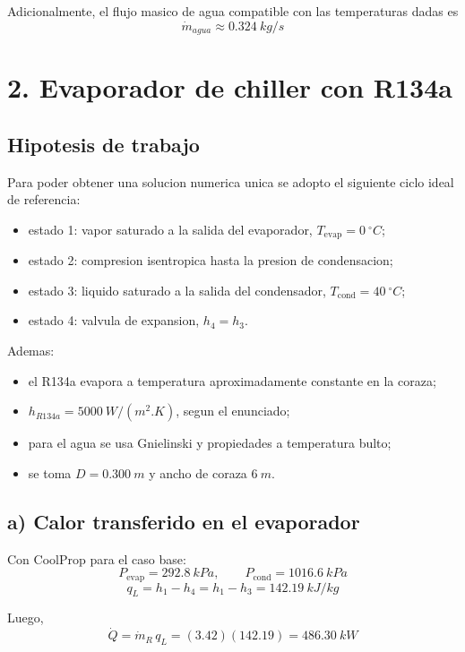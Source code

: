 \documentclass[11pt]{article}
\begin{document}
Adicionalmente, el flujo masico de agua compatible con las temperaturas dadas es
\[
\boxed{\dot m_{agua}\approx \SI{0.324}{kg/s}}
\]

\section*{2. Evaporador de chiller con R134a}

\subsection*{Hipotesis de trabajo}

Para poder obtener una solucion numerica unica se adopto el siguiente ciclo ideal de referencia:

\begin{itemize}
  \item estado 1: vapor saturado a la salida del evaporador, \(T_{\mathrm{evap}}=\SI{0}{^\circ C}\);
  \item estado 2: compresion isentropica hasta la presion de condensacion;
  \item estado 3: liquido saturado a la salida del condensador, \(T_{\mathrm{cond}}=\SI{40}{^\circ C}\);
  \item estado 4: valvula de expansion, \(h_4=h_3\).
\end{itemize}

Ademas:

\begin{itemize}
  \item el R134a evapora a temperatura aproximadamente constante en la coraza;
  \item \(h_{R134a}=\SI{5000}{W/(m^2.K)}\), segun el enunciado;
  \item para el agua se usa Gnielinski y propiedades a temperatura bulto;
  \item se toma \(D=\SI{0.300}{m}\) y ancho de coraza \(\SI{6}{m}\).
\end{itemize}

\subsection*{a) Calor transferido en el evaporador}

Con CoolProp para el caso base:
\[
P_{\mathrm{evap}}=\SI{292.8}{kPa}, \qquad
P_{\mathrm{cond}}=\SI{1016.6}{kPa}
\]
\[
q_L=h_1-h_4=h_1-h_3=\SI{142.19}{kJ/kg}
\]

Luego,
\[
\dot Q=\dot m_R\,q_L=(3.42)(142.19)=\SI{486.30}{kW}
\]
\end{document}
